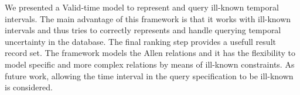 We presented a Valid-time model to represent and query ill-known temporal intervals. The main advantage of this framework is that it works with ill-known intervals and thus tries to correctly represents and handle querying temporal uncertainty in the database. The final ranking step provides a usefull result record set. The framework models the Allen relations and it has the flexibility to model specific and more complex relations by means of ill-known constraints. As future work, allowing the time interval in the query specification to be ill-known is considered.
